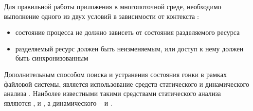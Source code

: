 %
Для правильной работы приложения в многопоточной среде, необходимо выполнение одного из двух условий в зависимости от контекста  : 
\begin{itemize}
	
	\item состояние процесса не должно зависеть от состояния разделяемого ресурса
	
	\item разделяемый ресурс должен быть неизменяемым, или доступ к нему должен быть 
		синхронизованным 
\end{itemize}

%
Дополнительным способом поиска и устранения состояния гонки в рамках файловой системы, является использование средств статического и динамического анализа . 
%
Наиболее известными такими средствами статического анализа являются  ,   и  , а динамического –   и  . 